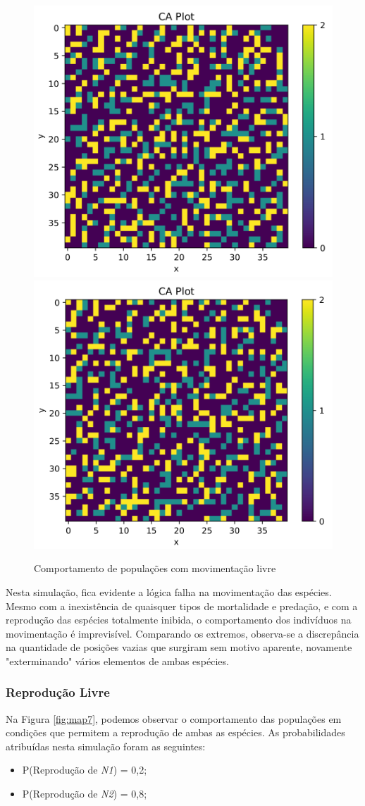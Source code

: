 \documentclass[a4paper, 12pt]{article}
\begin{document}
\begin{figure}[H]
    \includegraphics[width=.49\textwidth]{Images/Exercise 7/move/9.png}
    \includegraphics[width=.49\textwidth]{Images/Exercise 7/move/10.png}
    \caption{Comportamento de populações com movimentação livre}
    \label{fig:map5}
\end{figure}

\pagebreak

Nesta simulação, fica evidente a lógica falha na movimentação das espécies. Mesmo com a inexistência de quaisquer tipos de mortalidade e predação, e com a reprodução das espécies totalmente inibida, o comportamento dos indivíduos na movimentação é imprevisível. Comparando os extremos, observa-se a discrepância na quantidade de posições vazias que surgiram sem motivo aparente, novamente "exterminando" \hspace{0.1cm}vários elementos de ambas espécies.

\subsubsection*{Reprodução Livre}

Na Figura \ref{fig:map7}, podemos observar o comportamento das populações em condições que permitem a reprodução de ambas as espécies. As probabilidades atribuídas nesta simulação foram as seguintes:

\begin{itemize}
    \item P(Reprodução de \emph{N1}) = 0,2;
    \item P(Reprodução de \emph{N2}) = 0,8;
\end{itemize}
\end{document}
